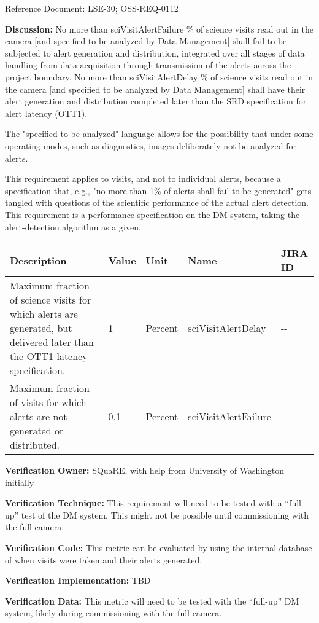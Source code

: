 Reference Document: LSE-30; OSS-REQ-0112

\textbf{Discussion:} No more than sciVisitAlertFailure \% of science
visits read out in the camera {[}and specified to be analyzed by Data
Management{]} shall fail to be subjected to alert generation and
distribution, integrated over all stages of data handling from data
acquisition through transmission of the alerts across the project
boundary. No more than sciVisitAlertDelay \% of science visits read out
in the camera {[}and specified to be analyzed by Data Management{]}
shall have their alert generation and distribution completed later than
the SRD specification for alert latency (OTT1).

The "specified to be analyzed" language allows for the possibility that
under some operating modes, such as diagnostics, images deliberately not
be analyzed for alerts.

This requirement applies to visits, and not to individual alerts,
because a specification that, e.g., "no more than 1\% of alerts shall
fail to be generated" gets tangled with questions of the scientific
performance of the actual alert detection. This requirement is a
performance specification on the DM system, taking the alert-detection
algorithm as a given.

\begin{longtable}[]{@{}lllll@{}}
\toprule
Description & Value & Unit & Name & JIRA ID\tabularnewline
\midrule
\endhead
Maximum fraction of science visits for which alerts are generated, but
delivered later than the OTT1 latency specification. & 1 & Percent &
sciVisitAlertDelay & -\/-\tabularnewline
Maximum fraction of visits for which alerts are not generated or
distributed. & 0.1 & Percent & sciVisitAlertFailure &
-\/-\tabularnewline
\bottomrule
\end{longtable}

\textbf{Verification Owner:} SQuaRE, with help from University of
Washington initially

\textbf{Verification Technique:} This requirement will need to be tested
with a ``full-up'' test of the DM system. This might not be possible
until commissioning with the full camera.

\textbf{Verification Code:} This metric can be evaluated by using the
internal database of when visits were taken and their alerts generated.

\textbf{Verification Implementation:} TBD

\textbf{Verification Data:} This metric will need to be tested with the
``full-up'' DM system, likely during commissioning with the full camera.


